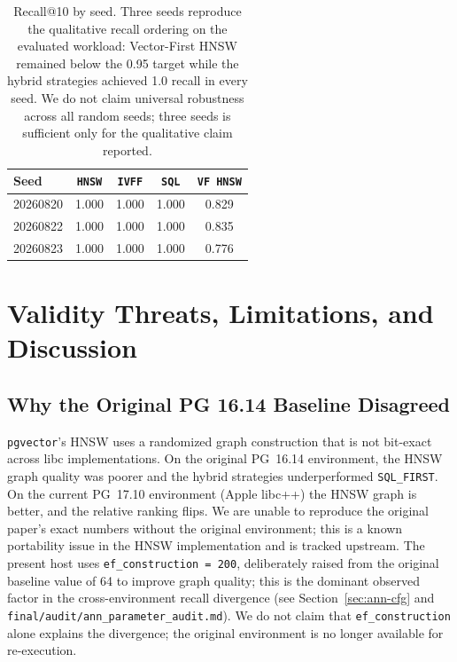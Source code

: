 \documentclass[conference]{IEEEtran}
\begin{document}
\begin{table}[t]
\centering
\caption{Recall@10 by seed. Three seeds reproduce the qualitative recall
ordering on the evaluated workload: Vector-First HNSW remained below the
0.95 target while the hybrid strategies achieved 1.0 recall in every
seed. We do not claim universal robustness across all random seeds; three
seeds is sufficient only for the qualitative claim reported.}
\label{tab:seeds}
\begin{tabular}{lcccc}
\toprule
\textbf{Seed}     & \texttt{HNSW} & \texttt{IVFF} & \texttt{SQL} & \texttt{VF~HNSW} \\
\midrule
20260820 & 1.000 & 1.000 & 1.000 & 0.829 \\
20260822 & 1.000 & 1.000 & 1.000 & 0.835 \\
20260823 & 1.000 & 1.000 & 1.000 & 0.776 \\
\bottomrule
\end{tabular}
\end{table}

\section{Validity Threats, Limitations, and Discussion}
\label{sec:discussion}

\subsection{Why the Original PG 16.14 Baseline Disagreed}
\label{sec:divergence}

\texttt{pgvector}'s HNSW uses a randomized graph construction that is
not bit-exact across libc implementations. On the original PG~16.14
environment, the HNSW graph quality was poorer and the hybrid strategies
underperformed \texttt{SQL\_FIRST}. On the current PG~17.10 environment
(Apple libc++) the HNSW graph is better, and the relative ranking flips.
We are unable to reproduce the original paper's exact numbers without the
original environment; this is a known portability issue in the HNSW
implementation and is tracked upstream. The present host uses
\texttt{ef\_construction = 200}, deliberately raised from the original
baseline value of 64 to improve graph quality; this is the dominant
observed factor in the cross-environment recall divergence (see
Section~\ref{sec:ann-cfg} and
\texttt{final/audit/ann\_parameter\_audit.md}). We do not claim that
\texttt{ef\_construction} alone explains the divergence; the original
environment is no longer available for re-execution.
\end{document}
